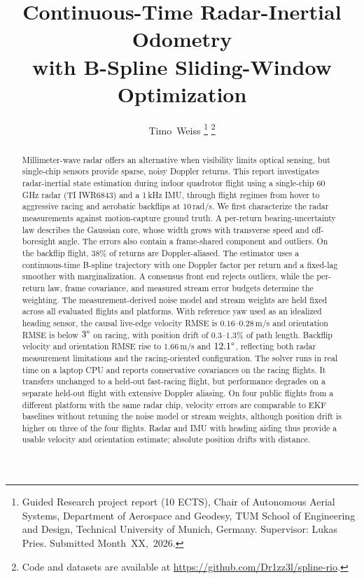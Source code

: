 \documentclass[journal]{IEEEtran}
\begin{document}
\title{Continuous-Time Radar-Inertial Odometry\\with B-Spline Sliding-Window Optimization}

\author{Timo~Weiss%
\thanks{Guided Research project report (10 ECTS), Chair of Autonomous
Aerial Systems, Department of Aerospace and Geodesy, TUM School of
Engineering and Design, Technical University of Munich, Germany.
Supervisor: Lukas Pries.  Submitted Month~XX,~2026.}%
\thanks{Code and datasets are available at
\protect\url{https://github.com/Dr1zz3l/spline-rio}.}}

\maketitle

\begin{abstract}
Millimeter-wave radar offers an alternative when visibility limits
optical sensing, but single-chip sensors provide sparse, noisy Doppler
returns.  This report investigates radar-inertial state estimation
during indoor quadrotor flight using a single-chip 60\,GHz radar
(TI IWR6843) and a 1\,kHz IMU, through flight regimes
from hover to aggressive racing and aerobatic backflips at
$10$\,rad/s.  We first characterize the radar
measurements against motion-capture ground truth.  A per-return
bearing-uncertainty law describes the Gaussian core, whose width grows
with transverse speed and off-boresight angle.  The errors also contain
a frame-shared component and outliers.  On the backflip flight, 38\% of
returns are Doppler-aliased.  The estimator uses a continuous-time
B-spline trajectory with one Doppler factor per return and a fixed-lag
smoother with marginalization.  A consensus front end rejects outliers,
while the per-return law, frame covariance, and measured stream error
budgets determine the weighting.  The measurement-derived noise model
and stream weights are held fixed across all evaluated flights and
platforms.
With reference yaw used as an idealized heading sensor, the causal
live-edge velocity RMSE is $0.16$--$0.28$\,m/s and orientation RMSE
is below $3\degree$ on racing, with position drift of
$0.3$--$1.3\%$ of path length.  Backflip velocity and orientation RMSE
rise to $1.66$\,m/s and $12.1\degree$, reflecting both radar measurement
limitations and the racing-oriented configuration.  The solver runs
in real time on a laptop CPU and reports conservative covariances on
the racing flights.  It transfers unchanged to a held-out fast-racing
flight, but performance degrades on a separate held-out flight with
extensive Doppler aliasing.  On four public flights from a
different platform with the same radar chip, velocity errors
are comparable to EKF baselines without retuning the noise model or
stream weights, although position drift is higher on three of the
four flights.  Radar and IMU with heading aiding thus provide a usable
velocity and orientation estimate; absolute position drifts with distance.
\end{abstract}
\end{document}
